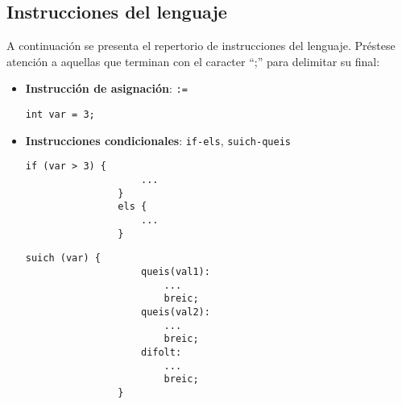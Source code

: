 \documentclass[10pt,a4paper]{article}
\begin{document}
\subsection{Instrucciones del lenguaje}\label{subsec:Instrucciones del lenguaje}
A continuación se presenta el repertorio de instrucciones del lenguaje. Préstese atención a aquellas que terminan con el caracter ``;'' para delimitar su final:
\begin{itemize}
    \item \textbf{Instrucción de asignación}: \texttt{:=}
    \begin{center}
        \begin{minipage}{\linewidth}
            \begin{lstlisting}[linewidth=0.3\linewidth, gobble=16]
                int var = 3;
            \end{lstlisting}
        \end{minipage}
    \end{center}
    
    \item \textbf{Instrucciones condicionales}: \texttt{if-els}, \texttt{suich-queis}
    \begin{center}
        \begin{minipage}{\linewidth}
            \begin{lstlisting}[linewidth=0.3\linewidth, gobble=16]
                if (var > 3) {
                    ...
                }
                els {
                    ...
                }
            \end{lstlisting}
        \end{minipage}
    \end{center}
    \begin{center}
        \begin{minipage}{\linewidth}
            \begin{lstlisting}[linewidth=0.3\linewidth, gobble=16]
                suich (var) {
                    queis(val1):
                        ...
                        breic;
                    queis(val2):
                        ...
                        breic;
                    difolt:
                        ...
                        breic;
                }
            \end{lstlisting}
        \end{minipage}
    \end{center}


\end{itemize}
\end{document}
